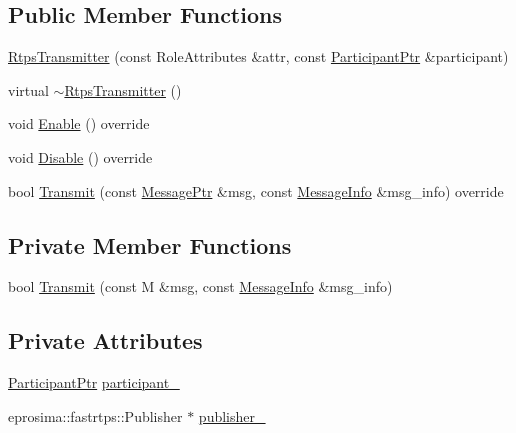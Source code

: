 \subsection*{Public Member Functions}
\begin{DoxyCompactItemize}
\item 
\hyperlink{classapollo_1_1cyber_1_1transport_1_1RtpsTransmitter_a2376cdaa9fdd993c38667a649ed8d0f3}{Rtps\-Transmitter} (const Role\-Attributes \&attr, const \hyperlink{namespaceapollo_1_1cyber_1_1transport_a4214d0780331276d0384d0b57e3bc688}{Participant\-Ptr} \&participant)
\item 
virtual \hyperlink{classapollo_1_1cyber_1_1transport_1_1RtpsTransmitter_ad66434208a05c95a1ee81e45a2ee800d}{$\sim$\-Rtps\-Transmitter} ()
\item 
void \hyperlink{classapollo_1_1cyber_1_1transport_1_1RtpsTransmitter_ad07be793652401a452cea8eaa6bdbfd4}{Enable} () override
\item 
void \hyperlink{classapollo_1_1cyber_1_1transport_1_1RtpsTransmitter_acbbdfe917b0b8a3e6906db9898925c06}{Disable} () override
\item 
bool \hyperlink{classapollo_1_1cyber_1_1transport_1_1RtpsTransmitter_a0cb0df26a9ba248ed95a25d0bf4e8bb3}{Transmit} (const \hyperlink{classapollo_1_1cyber_1_1transport_1_1RtpsTransmitter_a28d14859d872c87fc358036e87487663}{Message\-Ptr} \&msg, const \hyperlink{classapollo_1_1cyber_1_1transport_1_1MessageInfo}{Message\-Info} \&msg\-\_\-info) override
\end{DoxyCompactItemize}
\subsection*{Private Member Functions}
\begin{DoxyCompactItemize}
\item 
bool \hyperlink{classapollo_1_1cyber_1_1transport_1_1RtpsTransmitter_a6ec79fc9ea9654baa55ee235972946ac}{Transmit} (const M \&msg, const \hyperlink{classapollo_1_1cyber_1_1transport_1_1MessageInfo}{Message\-Info} \&msg\-\_\-info)
\end{DoxyCompactItemize}
\subsection*{Private Attributes}
\begin{DoxyCompactItemize}
\item 
\hyperlink{namespaceapollo_1_1cyber_1_1transport_a4214d0780331276d0384d0b57e3bc688}{Participant\-Ptr} \hyperlink{classapollo_1_1cyber_1_1transport_1_1RtpsTransmitter_a6f79ba7787f01af33bb5f5b08af0a16c}{participant\-\_\-}
\item 
eprosima\-::fastrtps\-::\-Publisher $\ast$ \hyperlink{classapollo_1_1cyber_1_1transport_1_1RtpsTransmitter_a4a5d225edef1b0e744450f1043fa3ab8}{publisher\-\_\-}
\end{DoxyCompactItemize}
